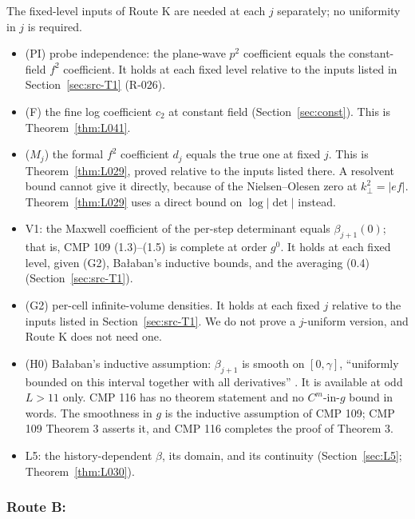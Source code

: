 The fixed-level inputs of Route K are needed at each $j$ separately; no uniformity in $j$ is required.
\begin{itemize}
\item (PI) probe independence: the plane-wave $p^2$ coefficient equals the constant-field $f^2$ coefficient. It holds at each fixed level relative to the inputs listed in Section~\ref{sec:src-T1} (R-026).
\item (F) the fine log coefficient $c_2$ at constant field (Section~\ref{sec:const}). This is Theorem~\ref{thm:L041}.
\item ($M_j$) the formal $f^2$ coefficient $d_j$ equals the true one at fixed $j$. This is Theorem~\ref{thm:L029}, proved relative to the inputs listed there. A resolvent bound cannot give it directly, because of the Nielsen--Olesen zero at $k_\perp^2=|ef|$. Theorem~\ref{thm:L029} uses a direct bound on $\log|\det|$ instead.
\item V1: the Maxwell coefficient of the per-step determinant equals $\beta_{j+1}(0)$; that is, CMP 109 (1.3)--(1.5) is complete at order $g^0$. It holds at each fixed level, given (G2), Ba{\l}aban's inductive bounds, and the averaging (0.4) (Section~\ref{sec:src-T1}).
\item (G2) per-cell infinite-volume densities. It holds at each fixed $j$ relative to the inputs listed in Section~\ref{sec:src-T1}. We do not prove a $j$-uniform version, and Route K does not need one.
\item (H0) Ba{\l}aban's inductive assumption: $\beta_{j+1}$ is smooth on $[0,\gamma]$, ``uniformly bounded on this interval together with all derivatives'' \cite[pp.~263--264, (1.22)]{balaban109}. It is available at odd $L>11$ only. CMP 116 has no theorem statement and no $C^m$-in-$g$ bound in words. The smoothness in $g$ is the inductive assumption of CMP 109; CMP 109 Theorem 3 asserts it, and CMP 116 completes the proof of Theorem 3.
\item L5: the history-dependent $\beta$, its domain, and its continuity (Section~\ref{sec:L5}; Theorem~\ref{thm:L030}).
\end{itemize}

\subsubsection{Route B: \ThmPW{}}\label{sec:routeB}

